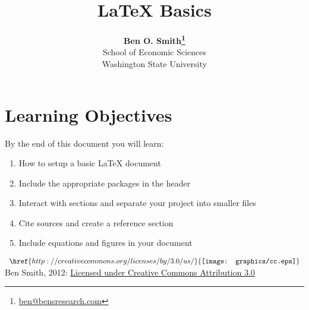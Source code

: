 \documentclass[11pt]{article}
\begin{document}
 

\title{LaTeX Basics}
\date{}
\author{\textbf{Ben O. Smith\footnote{\href{mailto:ben@bensresearch.com}{ben@bensresearch.com}}} \\
School of Economic Sciences \\
Washington State University}
\maketitle 

\section*{Learning Objectives}

By the end of this document you will learn:

\begin{enumerate}
	\item How to setup a basic LaTeX document
	\item Include the appropriate packages in the header
	\item Interact with sections and separate your project into smaller files
	\item Cite sources and create a reference section
	\item Include equations and figures in your document
\end{enumerate}

\doublespace







\printbibliography[title=Bibliography]
\vspace{\fill}
\noindent $ \begin{array}{l} \href{http://creativecommons.org/licenses/by/3.0/us/}{\texttt{[image: graphics/cc.eps]}} \end{array} $ Ben Smith, 2012: \href{http://creativecommons.org/licenses/by/3.0/us/}{Licensed under Creative Commons Attribution 3.0}
\end{document}
